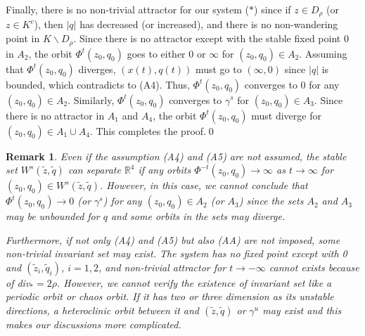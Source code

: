 \documentclass[11pt,reqno]{amsart}
\newtheorem{remark}[theorem]{Remark}
\begin{document}
Finally, there is no non-trivial attractor for our system ($\ast$) since if $z\in D_\rho$ (or $z\in K^c$), then $|q|$ has decreased (or increased), and there is no non-wandering point in $K\backslash D_\rho$. Since there is no attractor except with the stable fixed point 0 in $A_2$, the orbit $\Phi^t(z_0,q_0)$ goes to either 0 or $\infty$ for $(z_0,q_0)\in A_2$. Assuming that $\Phi^t(z_0,q_0)$ diverges, $(x(t),q(t))$ must go to $(\infty,0)$ since $|q|$ is bounded, which contradicts to (A4). Thus, $\Phi^t(z_0,q_0)$ converges to 0 for any $(z_0,q_0)\in A_2$.
Similarly, $\Phi^t(z_0,q_0)$ converges to $\gamma^s$ for $(z_0,q_0)\in A_3$. 
Since there is no attractor in $A_1$ and $A_4$, the orbit $\Phi^t(z_0,q_0)$ must diverge for $(z_0,q_0)\in A_1\cup A_4$. This completes the proof.\qed

\begin{remark}\label{final}
Even if the assumption (A4) and (A5) are not assumed, the stable set $W^s(\tilde{z},\tilde{q})$ can separate $\mathbb{R}^4$ if any orbits $\Phi^{-t}(z_0,q_0)\to\infty$ as $t\to\infty$ for $(z_0,q_0)\in W^s(\tilde{z},\tilde{q})$. However, in this case, we cannot conclude that $\Phi^t(z_0,q_0)\to 0$ (or $\gamma^s$) for any $(z_0,q_0)\in A_2$ (or $A_3$) since the sets $A_2$ and $A_3$ may be unbounded for $q$ and some orbits in the sets may diverge.

Furthermore, if not only (A4) and (A5) but also (AA) are not imposed, some non-trivial invariant set may exist. The system has no fixed point except with 0 and $(\tilde{z}_i,\tilde{q}_i)$, $i=1,2$, and non-trivial attractor for $t\to-\infty$ cannot exists because of div$_*=2\rho$. However, we cannot verify the existence of invariant set like a periodic orbit or chaos orbit. If it has two or three dimension as its unstable directions, a heteroclinic orbit between it and $(\tilde{z},\tilde{q})$ or $\gamma^u$ may exist and this makes our discussions more complicated. 
\end{remark}
\end{document}

